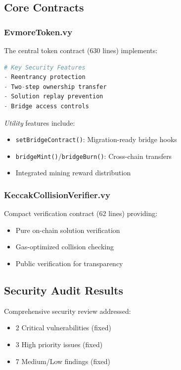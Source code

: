 \documentclass[11pt,a4paper]{article}
\begin{document}
\subsection{Core Contracts}

\subsubsection{EvmoreToken.vy}

The central token contract (630 lines) implements:

\begin{lstlisting}[language=Python]
# Key Security Features
- Reentrancy protection
- Two-step ownership transfer
- Solution replay prevention
- Bridge access controls
\end{lstlisting}

\textit{Utility} features include:
\begin{itemize}
    \item \texttt{setBridgeContract()}: Migration-ready bridge hooks
    \item \texttt{bridgeMint()}/\texttt{bridgeBurn()}: Cross-chain transfers
    \item Integrated mining reward distribution
\end{itemize}

\subsubsection{KeccakCollisionVerifier.vy}

Compact verification contract (62 lines) providing:

\begin{itemize}
    \item Pure on-chain solution verification
    \item Gas-optimized collision checking
    \item Public verification for transparency
\end{itemize}

\subsection{Security Audit Results}

Comprehensive security review addressed:

\begin{itemize}
    \item 2 Critical vulnerabilities (fixed)
    \item 3 High priority issues (fixed)
    \item 7 Medium/Low findings (fixed)
\end{itemize}
\end{document}
